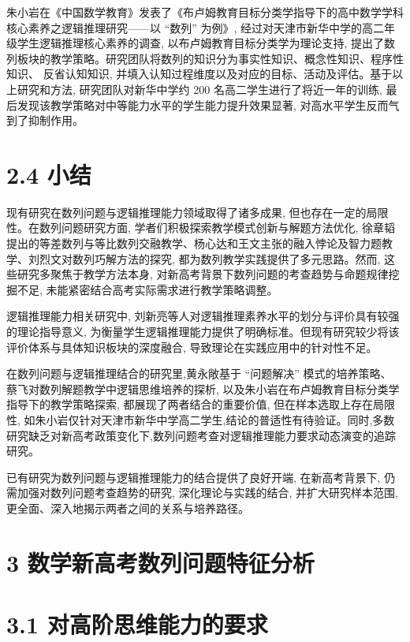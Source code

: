 \documentclass[10pt]{article}
\begin{document}
朱小岩在《中国数学教育》发表了《布卢姆教育目标分类学指导下的高中数学学科核心素养之逻辑推理研究——以 “数列” 为例》, 经过对天津市新华中学的高二年级学生逻辑推理核心素养的调查, 以布卢姆教育目标分类学为理论支持, 提出了数列板块的教学策略。研究团队将数列的知识分为事实性知识、概念性知识、程序性知识、 反省认知知识, 并填入认知过程维度以及对应的目标、活动及评估。基于以上研究和方法, 研究团队对新华中学约 200 名高二学生进行了将近一年的训练, 最后发现该教学策略对中等能力水平的学生能力提升效果显著, 对高水平学生反而气到了抑制作用。

\section*{2.4 小结}

现有研究在数列问题与逻辑推理能力领域取得了诸多成果, 但也存在一定的局限性。在数列问题研究方面, 学者们积极探索教学模式创新与解题方法优化, 徐章韬提出的等差数列与等比数列交融教学、杨心达和王文主张的融入悖论及智力题教学、刘烈文对数列巧解方法的探究, 都为数列教学实践提供了多元思路。然而, 这些研究多聚焦于教学方法本身, 对新高考背景下数列问题的考查趋势与命题规律挖掘不足, 未能紧密结合高考实际需求进行教学策略调整。

逻辑推理能力相关研究中, 刘新亮等人对逻辑推理素养水平的划分与评价具有较强的理论指导意义, 为衡量学生逻辑推理能力提供了明确标准。但现有研究较少将该评价体系与具体知识板块的深度融合, 导致理论在实践应用中的针对性不足。

在数列问题与逻辑推理结合的研究里,黄永敞基于 “问题解决” 模式的培养策略、 蔡飞对数列解题教学中逻辑思维培养的探析, 以及朱小岩在布卢姆教育目标分类学指导下的教学策略探索, 都展现了两者结合的重要价值, 但在样本选取上存在局限性, 如朱小岩仅针对天津市新华中学高二学生,结论的普适性有待验证。同时,多数研究缺乏对新高考政策变化下,数列问题考查对逻辑推理能力要求动态演变的追踪研究。

已有研究为数列问题与逻辑推理能力的结合提供了良好开端, 在新高考背景下, 仍需加强对数列问题考查趋势的研究, 深化理论与实践的结合, 并扩大研究样本范围, 更全面、深入地揭示两者之间的关系与培养路径。

\section*{3 数学新高考数列问题特征分析}

\section*{3.1 对高阶思维能力的要求}
\end{document}
